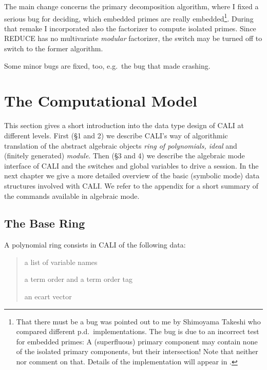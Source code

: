 The main change concerns the primary decomposition algorithm, where I
fixed a serious bug for deciding, which embedded primes are really
embedded\footnote{That there must be a bug was pointed out to me by
Shimoyama Takeshi who compared different p.d.\ implementations. The
bug is due to an incorrect test for embedded primes: A (superfluous)
primary component may contain none of the isolated primary components,
but their intersection! Note that neither \cite{GTZ} nor \cite{BKW}
comment on that. Details of the implementation will appear in
\cite{primary}.}. During that remake I incorporated also the \gr
factorizer to compute isolated primes. Since REDUCE has no
multivariate {\em modular} factorizer, the switch 
may be turned off to switch to the former algorithm.



Some minor bugs are fixed, too, e.g.\ the bug that made 
crashing.




\section{The Computational Model}

This section gives a short introduction into the data type design of
CALI at different levels. First (\S 1 and 2) we describe CALI's way
of algorithmic translation of the abstract algebraic objects {\em
ring of polynomials, ideal} and (finitely generated) {\em module}.
Then (\S 3 and 4) we describe the algebraic mode interface of CALI
and the switches and global variables to drive a session. In the next
chapter we give a more detailed overview of the basic (symbolic mode) data
structures involved with CALI. We refer to the appendix for a short
summary of the commands available in algebraic mode.

\subsection{The Base Ring}

A polynomial ring consists in CALI of the following data:
\begin{quote}
a list of variable names


a term order and a term order tag


an ecart vector

\end{quote}

